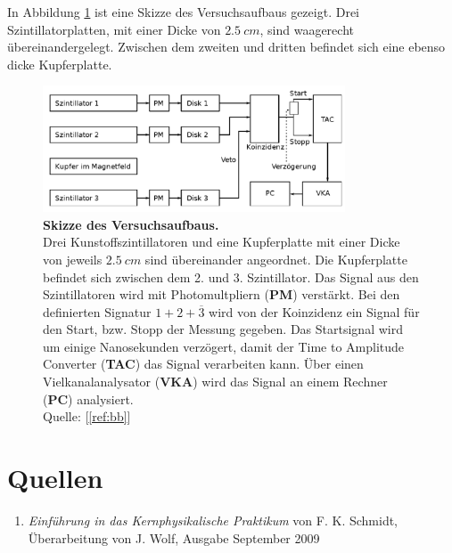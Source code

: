 \documentclass[a4paper,ngerman]{scrartcl}
\begin{document}
In Abbildung \ref{fig:aufbau_skizze} ist eine Skizze des Versuchsaufbaus gezeigt. Drei Szintillatorplatten, mit einer Dicke von $\SI{2.5}{cm}$, sind waagerecht übereinandergelegt. Zwischen dem zweiten und dritten befindet sich eine ebenso dicke Kupferplatte. 



\begin{figure}[tb!]
  \centering
  \includegraphics[width=0.8\textwidth]{abbildungen/aufbau_skizze.png}
  \caption{\textbf{Skizze des Versuchsaufbaus.} 
  \\ 
  Drei Kunstoffszintillatoren und eine Kupferplatte mit einer Dicke von jeweils $\SI{2.5}{cm}$ sind übereinander angeordnet. Die Kupferplatte befindet sich zwischen dem 2. und 3. Szintillator. Das Signal aus den Szintillatoren wird mit Photomultpliern (\textbf{PM}) verstärkt. Bei den definierten Signatur $1 + 2 + \overline{3}$ wird von der Koinzidenz ein Signal für den Start, bzw. Stopp der Messung gegeben. Das Startsignal wird um einige Nanosekunden verzögert, damit der Time to Amplitude Converter (\textbf{TAC}) das Signal verarbeiten kann. Über einen Vielkanalanalysator (\textbf{VKA}) wird das Signal an einem Rechner (\textbf{PC}) analysiert.
  \\Quelle: [\ref{ref:bb}]}
  \label{fig:aufbau_skizze}
\end{figure}





\clearpage
\section{Quellen}
\begin{enumerate}
\item \emph{Einführung in das Kernphysikalische Praktikum} von F. K. Schmidt, 
  Überarbeitung von J. Wolf, Ausgabe September 2009 \label{ref:bb}
\end{enumerate}
\end{document}
